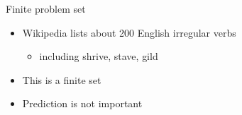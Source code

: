 \documentclass[10pt, compress]{beamer}		%
\begin{document}
\begin{frame}{Finite problem set}
	\begin{itemize}
		\item Wikipedia lists about 200 English irregular verbs
		\begin{itemize}
			\item including \alert{shrive}, \alert{stave}, \alert{gild}
		\end{itemize}
		\item This is a finite set%
		\item Prediction is not important
	\end{itemize}
\end{frame}


\end{document}

